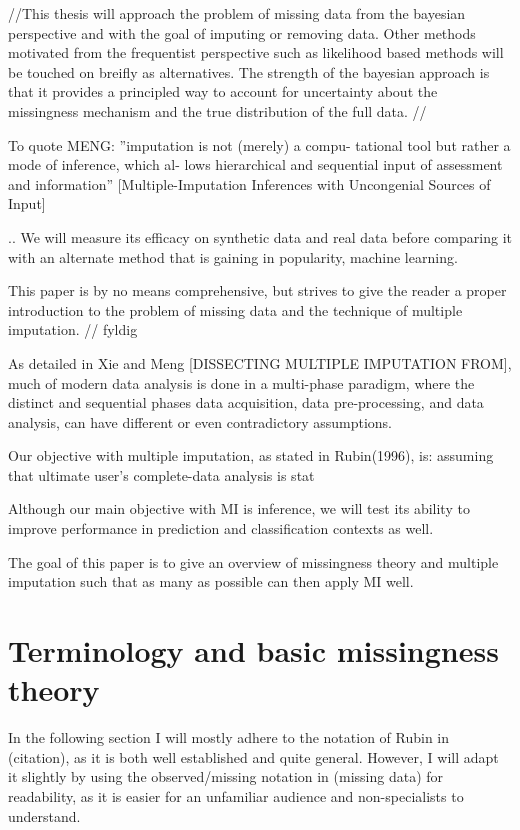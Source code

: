 \documentclass{article}
\begin{document}
	//This thesis will approach the problem of missing data from the bayesian perspective and with the goal of imputing or removing data. Other methods motivated from the frequentist perspective such as likelihood based methods will be touched on breifly as alternatives. The strength of the bayesian approach is that it provides a principled way to account for uncertainty about the missingness mechanism and the true distribution of the full data. //
	
	To quote MENG: ''imputation is not (merely) a compu-
	tational tool but rather a mode of inference, which al-
	lows hierarchical and sequential input of assessment
	and information'' [Multiple-Imputation Inferences with Uncongenial Sources of Input]
	
	
	.. We will measure its efficacy on synthetic data and real data before comparing it with an alternate method that is gaining in popularity, machine learning.
	
	This paper is by no means comprehensive, but strives to give the reader a proper introduction to the problem of missing data and the technique of multiple imputation.
	// fyldig
	
	As detailed in Xie and Meng [DISSECTING MULTIPLE IMPUTATION FROM], much of modern data analysis is done in a multi-phase paradigm, where the distinct and sequential phases data acquisition, data pre-processing, and data analysis, can have different or even contradictory assumptions.
	
	Our objective with multiple imputation, as stated in Rubin(1996), is: assuming that ultimate user's complete-data analysis is stat
	
	Although our main objective with MI is inference, we will test its ability to improve performance in prediction and classification contexts as well.
	
	The goal of this paper is to give an overview of missingness theory and multiple imputation such that as many as possible can then apply MI well.
	
	\section{Terminology and basic missingness theory}
	In the following section I will mostly adhere to the notation of Rubin in (citation), as it is both well established and quite general. However, I will adapt it slightly by using the observed/missing notation in (missing data) for readability, as it is easier for an unfamiliar audience and non-specialists to understand.
	
\end{document}
